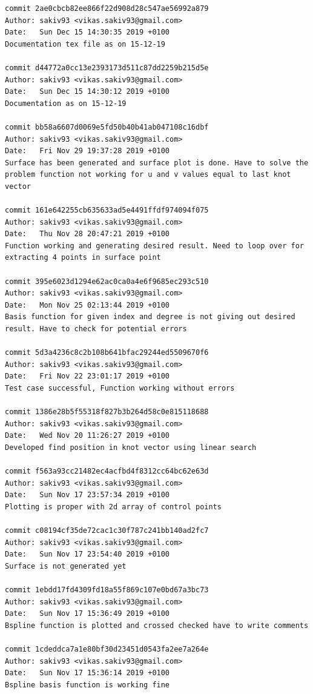 \documentclass[11pt]{article}
\begin{document}
\begin{Verbatim}[breaklines=true]
commit 2ae0cbcb82ee866f22d908d28c547ae56992a879
Author: sakiv93 <vikas.sakiv93@gmail.com>
Date:   Sun Dec 15 14:30:35 2019 +0100
Documentation tex file as on 15-12-19

commit d44772a0cc13e2393173d511c87dd2259b215d5e
Author: sakiv93 <vikas.sakiv93@gmail.com>
Date:   Sun Dec 15 14:30:12 2019 +0100
Documentation as on 15-12-19

commit bb58a6607d0069e5fd50b40b41ab047108c16dbf
Author: sakiv93 <vikas.sakiv93@gmail.com>
Date:   Fri Nov 29 19:37:28 2019 +0100
Surface has been generated and surface plot is done. Have to solve the problem function not working for u and v values equal to last knot vector

commit 161e642255cb635633ad5e4491ffdf974094f075
Author: sakiv93 <vikas.sakiv93@gmail.com>
Date:   Thu Nov 28 20:47:21 2019 +0100
Function working and generating desired result. Need to loop over for extracting 4 points in surface point

commit 395e6023d1294e62ac0ca0a4e6f9685ec293c510
Author: sakiv93 <vikas.sakiv93@gmail.com>
Date:   Mon Nov 25 02:13:44 2019 +0100
Basis function for given index and degree is not giving out desired result. Have to check for potential errors

commit 5d3a4236c8c2b108b641bfac29244ed5509670f6
Author: sakiv93 <vikas.sakiv93@gmail.com>
Date:   Fri Nov 22 23:01:17 2019 +0100
Test case successful, Function working without errors

commit 1386e28b5f55318f827b3b264d58c0e815118688
Author: sakiv93 <vikas.sakiv93@gmail.com>
Date:   Wed Nov 20 11:26:27 2019 +0100
Developed find position in knot vector using linear search

commit f563a93cc21482ec4acfbd4f8312cc64bc62e63d
Author: sakiv93 <vikas.sakiv93@gmail.com>
Date:   Sun Nov 17 23:57:34 2019 +0100
Plotting is proper with 2d array of control points

commit c08194cf35de72cac1c30f787c241bb140ad2fc7
Author: sakiv93 <vikas.sakiv93@gmail.com>
Date:   Sun Nov 17 23:54:40 2019 +0100
Surface is not generated yet

commit 1ebdd17fd4309fd18a55f869c107e0bd67a3bc73
Author: sakiv93 <vikas.sakiv93@gmail.com>
Date:   Sun Nov 17 15:36:49 2019 +0100
Bspline function is plotted and crossed checked have to write comments

commit 1cdeddca7a1e80bf30d23451d0543fa2ee7a264e
Author: sakiv93 <vikas.sakiv93@gmail.com>
Date:   Sun Nov 17 15:36:14 2019 +0100
Bspline basis function is working fine


\end{Verbatim}
\end{document}

